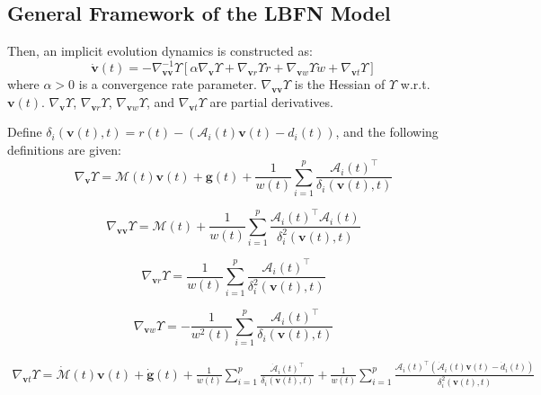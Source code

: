 \documentclass[pdflatex,sn-mathphys,Numbered]{sn-jnl}
\theoremstyle{thmstyleone}
\theoremstyle{thmstyletwo}
\theoremstyle{thmstylethree}
\begin{document}
\subsection{General Framework of the LBFN Model}\label{subsec22}
Then, an implicit evolution dynamics is constructed as:
\begin{equation}
\dot{\bm{v}}(t) = -\nabla_{\bm{v}\bm{v}}^{-1} \Upsilon \left[ \alpha \nabla_{\bm{v}} \Upsilon + \nabla_{\bm{v} r} \Upsilon \dot{r} + \nabla_{\bm{v} w} \Upsilon \dot{w} + \nabla_{\bm{v} t} \Upsilon \right]
\label{eq:dynamics}
\end{equation}
where $\alpha > 0$ is a convergence rate parameter. $\nabla_{\bm{v} \bm{v}}\Upsilon$ is the Hessian of $\Upsilon$ w.r.t. $\bm{v}(t)$. $\nabla_{\bm{v}}\Upsilon$, $\nabla_{\bm{v} r}\Upsilon$, $\nabla_{\bm{v} w}\Upsilon$, and $\nabla_{\bm{v} t}\Upsilon$ are partial derivatives.

Define $\delta_i(\bm{v}(t),t)=r(t)-(\mathcal{A}_i(t)\bm{v}(t)-d_i(t))$, and the following definitions are given:
\begin{equation}
\nabla_{\bm{v}} \Upsilon = \mathcal{M}(t) \bm{v}(t) + \bm{g}(t) + \frac{1}{w(t)} \sum_{i=1}^{p} \frac{\mathcal{A}_i(t)^\top}{\delta_i(\bm{v}(t), t)}
\label{eq:grad_psi_u}
\end{equation}

\begin{equation}
\nabla_{\bm{v}\bm{v}} \Upsilon = \mathcal{M}(t) + \frac{1}{w(t)} \sum_{i=1}^{p} \frac{\mathcal{A}_i(t)^\top \mathcal{A}_i(t)}{\delta_i^2(\bm{v}(t), t)}
\label{eq:hessian_psi_uu}
\end{equation}

\begin{equation}
\nabla_{\bm{v} r} \Upsilon = \frac{1}{w(t)} \sum_{i=1}^{p} \frac{\mathcal{A}_i(t)^\top}{\delta_i^2(\bm{v}(t), t)}
\label{eq:grad_psi_ur}
\end{equation}

\begin{equation}
\nabla_{\bm{v} w} \Upsilon = -\frac{1}{w^2(t)} \sum_{i=1}^{p} \frac{\mathcal{A}_i(t)^\top}{\delta_i(\bm{v}(t), t)}
\label{eq:grad_psi_uw}
\end{equation}

\begin{equation}
\begin{aligned}
\nabla_{\bm{v} t} \Upsilon = \dot{\mathcal{M}}(t) \bm{v}(t) + \dot{\bm{g}}(t) + \frac{1}{w(t)} \sum_{i=1}^{p} \frac{\dot{\mathcal{A}}_i(t)^\top}{\delta_i(\bm{v}(t), t)}
+ \frac{1}{w(t)} \sum_{i=1}^{p} \frac{\mathcal{A}_i(t)^\top \left( \dot{\mathcal{A}}_i(t) \bm{v}(t) - \dot{d}_i(t) \right)}{\delta_i^2(\bm{v}(t), t)}
\end{aligned}
\label{eq:grad_psi_ut}
\end{equation}
\end{document}
